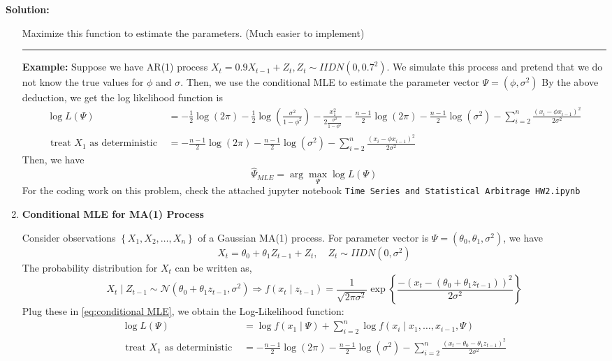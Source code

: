 \documentclass[11pt]{article}
\theoremstyle{plain} %
\newenvironment{solution}
{\color{C2}\normalfont\begin{framed}\begingroup\textbf{Solution:} }
  {\endgroup\end{framed}}
\theoremstyle{remark}
\begin{document}
\begin{solution}
\begin{enumerate}[label = (\alph*)]
          Maximize this function to estimate the parameters. (Much easier to implement)\\

          \hrule

          \textbf{Example:} Suppose we have AR(1) process $X_t=0.9X_{t-1}+Z_t, Z_t \sim IIDN\left(0,0.7^2\right)$. We simulate this process and pretend that we do not know the true values for $\phi$ and $\sigma$.
          Then, we use the conditional MLE to estimate the parameter vector $\Psi=\left(\phi, \sigma^2\right)$
          By the above deduction, we get the log likelihood function is
          \begin{align*}
            \log L(\Psi)                                 & =-\frac{1}{2} \log (2 \pi)-\frac{1}{2} \log \left(\frac{\sigma^2}{1-\phi^2}\right)-\frac{x_1^2}{2 \frac{\sigma^2}{1-\phi^2}}-\frac{n-1}{2} \log (2 \pi)-\frac{n-1}{2} \log \left(\sigma^2\right)-\sum_{i=2}^n \frac{\left(x_i-\phi x_{i-1}\right)^2}{2 \sigma^2} \\
            \text{ treat } X_1 \text{ as deterministic } & = -\frac{n-1}{2} \log (2 \pi)-\frac{n-1}{2} \log \left(\sigma^2\right)-\sum_{i=2}^n \frac{\left(x_i-\phi x_{i-1}\right)^2}{2 \sigma^2}
          \end{align*}
          Then, we have
          $$
            \hat{\Psi}_{MLE}=\arg \max_{\Psi} \log L(\Psi)
          $$
          For the coding work on this problem, check the attached jupyter notebook \texttt{Time Series and Statistical Arbitrage HW2.ipynb}
    \item \textbf{Conditional MLE for MA(1) Process}

          Consider observations $\left\{X_1, X_2, \ldots, X_n\right\}$ of a Gaussian
          MA(1) process. For parameter vector is $\Psi=\left(\theta_0, \theta_1, \sigma^2\right)$, we have
          $$
            X_t=\theta_0+\theta_1 Z_{t-1}+Z_t, \quad Z_t \sim IIDN\left(0, \sigma^2\right)
          $$
          The probability distribution for $X_t$ can be written as,
          $$
            X_t \mid Z_{t-1} \sim \mathcal{N}\left(\theta_0+\theta_1 z_{t-1}, \sigma^2\right) \Longrightarrow  f\left(x_t \mid z_{t-1}\right)=\frac{1}{\sqrt{2 \pi \sigma^2}} \exp \left\{\frac{-\left(x_t-\left(\theta_0+\theta_1 z_{t-1}\right)\right)^2}{2 \sigma^2}\right\}
          $$
          Plug these in \cref{eq:conditional MLE}, we obtain the Log-Likelihood function:
          \begin{align*}
            \log L(\Psi)                                 & = \log f(x_1 \mid \Psi) + \sum_{i=2}^{n} \log f(x_{i} \mid x_1, \ldots, x_{i-1}, \Psi)                                                              \\
            \text{ treat } X_1 \text{ as deterministic } & = -\frac{n-1}{2} \log (2 \pi)-\frac{n-1}{2} \log \left(\sigma^2\right)-\sum_{i=2}^n \frac{\left(x_t-\theta_0-\theta_1 z_{t-1}\right)^2}{2 \sigma^2}
          \end{align*}


\end{enumerate}
\end{solution}
\end{document}
